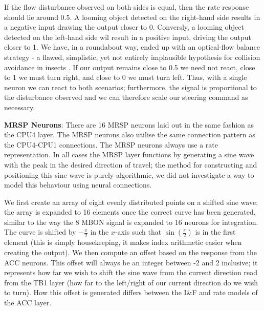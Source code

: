 \documentclass[a4paper,11pt,twoside,openright]{article}
\begin{document}
If the flow disturbance observed on both sides is equal, then the rate
response should lie around 0.5. A looming object detected on the
right-hand side results in a negative input drawing the output closer
to 0. Conversly, a looming object detected on the left-hand side wil
result in a positive input, driving the output closer to 1. We have,
in a roundabout way, ended up with an optical-flow balance strategy -
a flawed, simplistic, yet not entirely implausible hypothesis for
collision avoidance in insects \cite{Julien2017}. If our output
remains close to 0.5 we need not react, close to 1 we must turn right,
and close to 0 we must turn left. Thus, with a single neuron we can
react to both scenarios; furthermore, the signal is proportional to
the disturbance observed and we can therefore scale our steering
command as necessary.
\newline\par

\textbf{MRSP Neurons}:
There are 16 MRSP neurons laid out in the same fashion as the CPU4 layer. The
MRSP neurons also utilise the same connection pattern as the CPU4-CPU1
connections. The MRSP neurons always use a rate representation. In all
cases the MRSP layer functions by generating a sine wave with the peak in the
desired direction of travel; the method for constructing and positioning this
sine wave is purely algorithmic, we did not investigate a way to model this
behaviour using neural connections.
\newline\par

We first create an array of eight evenly distributed points on a
shifted sine wave; the array is expanded to 16 elements once the
correct curve has been generated, similar to the way the 8 MBON signal
is expanded to 16 neurons for integration.  The curve is shifted by
$-\frac{\pi}{2}$ in the $x$-axis such that $\sin(\frac{\pi}{2})$ is in
the first element (this is simply housekeeping, it makes index
arithmetic easier when creating the output). We then compute an offset
based on the response from the ACC neurons. This offset will always be
an integer between -2 and 2 inclusive; it represents how far we wish
to shift the sine wave from the current direction read from the TB1
layer (how far to the left/right of our current direction do we wish
to turn). How this offset is generated differs between the I\&F and
rate models of the ACC layer.
\newline\par
\end{document}
